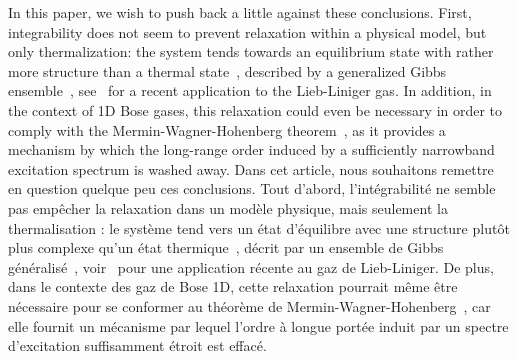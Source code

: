 \documentclass[aps,prd,notitlepage,amsfonts,amssymb,amsmath,nofootinbib,superscriptaddress,longbibliography]{revtex4-2}
\newcommand{\trad}[1]{\textcolor{tradcolor}{#1}}
\begin{document}
In this paper, we wish to push back a little against these conclusions. 
First, integrability does not seem to prevent relaxation within a physical model, but only thermalization: the system tends towards an equilibrium state with rather more structure than a thermal state~\cite{Kinoshita2006}, described by a generalized Gibbs ensemble~\cite{Rigol2007}, see~\cite{bouchouleRelaxation2022} for a recent application to the Lieb-Liniger gas.  In addition, in the context of 1D Bose gases, this relaxation could even be necessary in order to comply with the Mermin-Wagner-Hohenberg theorem~\cite{Hohenberg1967, Pitaevskii2016}, as it provides a mechanism by which the long-range order induced by a sufficiently narrowband excitation spectrum is washed away.
\trad{
Dans cet article, nous souhaitons remettre en question quelque peu ces conclusions. 
Tout d'abord, l'intégrabilité ne semble pas empêcher la relaxation dans un modèle physique, mais seulement la thermalisation : le système tend vers un état d'équilibre avec une structure plutôt plus complexe qu'un état thermique~\cite{Kinoshita2006}, décrit par un ensemble de Gibbs généralisé~\cite{Rigol2007}, voir~\cite{bouchouleRelaxation2022} pour une application récente au gaz de Lieb-Liniger. De plus, dans le contexte des gaz de Bose 1D, cette relaxation pourrait même être nécessaire pour se conformer au théorème de Mermin-Wagner-Hohenberg~\cite{Hohenberg1967, Pitaevskii2016}, car elle fournit un mécanisme par lequel l'ordre à longue portée induit par un spectre d'excitation suffisamment étroit est effacé.
}
\end{document}

